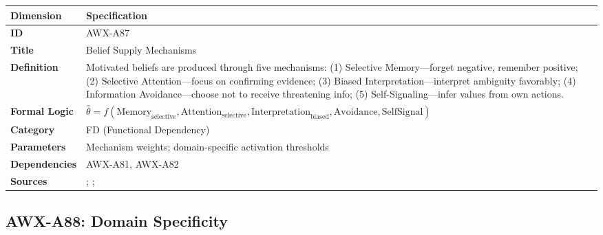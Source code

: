 \begin{table}[htbp]
\small
\begin{tabular}{p{3cm}p{11cm}}
\toprule
\textbf{Dimension} & \textbf{Specification} \\
\midrule
\textbf{ID} & AWX-A87 \\
\textbf{Title} & Belief Supply Mechanisms \\
\textbf{Definition} & Motivated beliefs are produced through five mechanisms: (1) Selective Memory---forget negative, remember positive; (2) Selective Attention---focus on confirming evidence; (3) Biased Interpretation---interpret ambiguity favorably; (4) Information Avoidance---choose not to receive threatening info; (5) Self-Signaling---infer values from own actions. \\
\textbf{Formal Logic} & $\hat{\theta} = f(\text{Memory}_{\text{selective}}, \text{Attention}_{\text{selective}}, \text{Interpretation}_{\text{biased}}, \text{Avoidance}, \text{SelfSignal})$ \\
\textbf{Category} & FD (Functional Dependency) \\
\textbf{Parameters} & Mechanism weights; domain-specific activation thresholds \\
\textbf{Dependencies} & AWX-A81, AWX-A82 \\
\textbf{Sources} & \citet{benabou2002self}; \citet{golman2017information}; \citet{bodner2005self} \\
\bottomrule
\end{tabular}
\end{table}


\subsection{AWX-A88: Domain Specificity}


